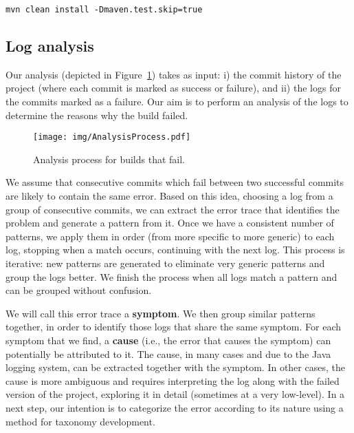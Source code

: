 

\begin{lstlisting}[caption={Example of a Maven build command},captionpos=b, label={listing:mvnscrpt}]
                      mvn clean install -Dmaven.test.skip=true
\end{lstlisting}


\subsection{Log analysis} 
\label{sssec:logAnalysis}

Our analysis (depicted in Figure~\ref{fig:AnalysisProcess}) takes as input:
   i) the commit history of the project (where each commit is marked as success or failure), and
   ii) the logs for the commits marked as a failure.
Our aim is to perform an analysis of the logs to determine the reasons why the build failed.

\begin{figure}[h]
	\centering    
	\texttt{[image: img/AnalysisProcess.pdf]}
	\caption{Analysis process for builds that fail.}
	\label{fig:AnalysisProcess}
\end{figure}

We assume that consecutive commits which fail between two successful commits are likely to contain the same error.
Based on this idea, choosing a log from a group of consecutive commits, we can extract the error trace that identifies the problem and generate a pattern from it.
Once we have a consistent number of patterns, we apply them in order (from more specific to more generic) to each log, stopping when a match occurs, continuing with the next log.
This process is iterative: new patterns are generated to eliminate very generic patterns and group the logs better.
We finish the process when all logs match a pattern and can be grouped without confusion.

We will call this error trace a \textbf{symptom}.
We then group similar patterns together, in order to identify those logs that share the same symptom.
For each symptom that we find, a \textbf{cause} (i.e., the error that causes the symptom) can potentially be attributed to it.
The cause, in many cases and due to the Java logging system, can be extracted together with the symptom.
In other cases, the cause is more ambiguous and requires interpreting the log along with the failed version of the project, exploring it in detail (sometimes at a very low-level).
In a next step, our intention is to categorize the error according to its nature using a method for taxonomy development.

